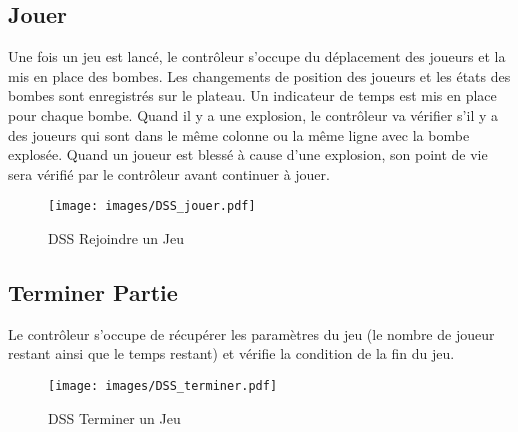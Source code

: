 \subsection{Jouer}
Une fois un jeu est lancé, le contrôleur s'occupe du déplacement des joueurs et la mis en place des bombes. Les changements de position des joueurs et les états des bombes sont enregistrés sur le plateau. Un indicateur de temps est mis en place pour chaque bombe. Quand il y a une explosion, le contrôleur va vérifier s'il y a des joueurs qui sont dans le même colonne ou la même ligne avec la bombe explosée. Quand un joueur est blessé à cause d'une explosion, son point de vie sera vérifié par le contrôleur avant continuer à jouer.
\begin{figure}[h!]
	\centering
	\texttt{[image: images/DSS\_jouer.pdf]}
	\caption{DSS Rejoindre un Jeu}
\end{figure}
\newpage

\subsection{Terminer Partie}

Le contrôleur s'occupe de récupérer les paramètres du jeu (le nombre 
de joueur restant ainsi que le temps restant) et vérifie la condition 
de la fin du jeu.
\begin{figure}[h!]
	\centering 
	\texttt{[image: images/DSS\_terminer.pdf]}
	\caption{DSS Terminer un Jeu}
\end{figure}
\newpage
	
